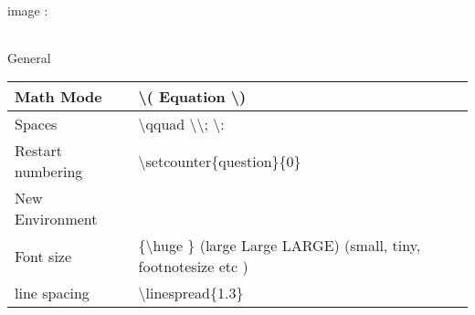 \begin{enumerate}
     \begin{minipage}{\linewidth}
     \item image :

          \begin{myTableStyle} \begin{tabular}{ |m{14cm}| } \hline
               \\ \hline
          \end{tabular} \end{myTableStyle} \vspace{0.08in}
     \end{minipage}

     \item   General

          \begin{myTableStyle} \begin{tabular}{ |m{4cm}|m{10cm}| } \hline
               Math Mode    &  \textbackslash ( Equation \textbackslash ) \\ \hline
               Spaces  & \textbackslash qquad  \qquad \textbackslash \qquad \textbackslash ; \qquad \textbackslash : \\ \hline

               Restart numbering &  \textbackslash setcounter\{question\}\{0\} \\ \hline

               New Environment &   \\ \hline

               Font size &  \{\textbackslash huge \}   (large Large LARGE) (small, tiny, footnotesize etc ) \\ \hline

               line spacing & \textbackslash linespread\{1.3\} \\ \hline
          \end{tabular} \end{myTableStyle} \vspace{0.08in}

\end{enumerate}
